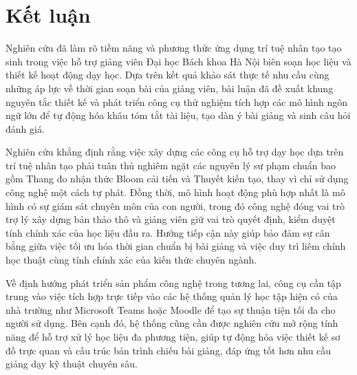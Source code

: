 \section{Kết luận}

Nghiên cứu đã làm rõ tiềm năng và phương thức ứng dụng trí tuệ nhân tạo tạo sinh trong việc hỗ trợ giảng viên Đại học Bách khoa Hà Nội biên soạn học liệu và thiết kế hoạt động dạy học. Dựa trên kết quả khảo sát thực tế nhu cầu cùng những áp lực về thời gian soạn bài của giảng viên, bài luận đã đề xuất khung nguyên tắc thiết kế và phát triển công cụ thử nghiệm tích hợp các mô hình ngôn ngữ lớn để tự động hóa khâu tóm tắt tài liệu, tạo dàn ý bài giảng và sinh câu hỏi đánh giá.

Nghiên cứu khẳng định rằng việc xây dựng các công cụ hỗ trợ dạy học dựa trên trí tuệ nhân tạo phải tuân thủ nghiêm ngặt các nguyên lý sư phạm chuẩn bao gồm Thang đo nhận thức Bloom cải tiến và Thuyết kiến tạo, thay vì chỉ sử dụng công nghệ một cách tự phát. Đồng thời, mô hình hoạt động phù hợp nhất là mô hình có sự giám sát chuyên môn của con người, trong đó công nghệ đóng vai trò trợ lý xây dựng bản thảo thô và giảng viên giữ vai trò quyết định, kiểm duyệt tính chính xác của học liệu đầu ra. Hướng tiếp cận này giúp bảo đảm sự cân bằng giữa việc tối ưu hóa thời gian chuẩn bị bài giảng và việc duy trì liêm chính học thuật cùng tính chính xác của kiến thức chuyên ngành.

Về định hướng phát triển sản phẩm công nghệ trong tương lai, công cụ cần tập trung vào việc tích hợp trực tiếp vào các hệ thống quản lý học tập hiện có của nhà trường như Microsoft Teams hoặc Moodle để tạo sự thuận tiện tối đa cho người sử dụng. Bên cạnh đó, hệ thống cũng cần được nghiên cứu mở rộng tính năng để hỗ trợ xử lý học liệu đa phương tiện, giúp tự động hóa việc thiết kế sơ đồ trực quan và cấu trúc bản trình chiếu bài giảng, đáp ứng tốt hơn nhu cầu giảng dạy kỹ thuật chuyên sâu.

